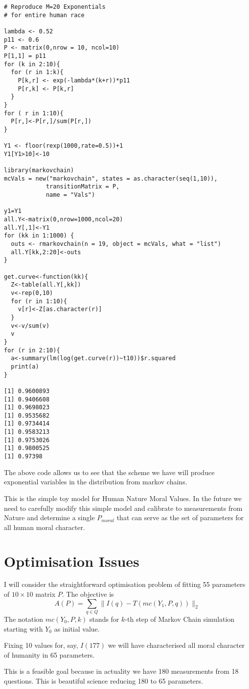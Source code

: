 \documentclass{amsart}
\begin{document}
\begin{verbatim}
# Reproduce M=20 Exponentials
# for entire human race

lambda <- 0.52
p11 <- 0.6
P <- matrix(0,nrow = 10, ncol=10)
P[1,1] = p11
for (k in 2:10){
  for (r in 1:k){
    P[k,r] <- exp(-lambda*(k+r))*p11
    P[r,k] <- P[k,r]
  }
}
for ( r in 1:10){
  P[r,]<-P[r,]/sum(P[r,])
}

Y1 <- floor(rexp(1000,rate=0.5))+1
Y1[Y1>10]<-10

library(markovchain)
mcVals = new("markovchain", states = as.character(seq(1,10)),
            transitionMatrix = P,          
            name = "Vals")

y1=Y1
all.Y<-matrix(0,nrow=1000,ncol=20)
all.Y[,1]<-Y1
for (kk in 1:1000) {
  outs <- rmarkovchain(n = 19, object = mcVals, what = "list")
  all.Y[kk,2:20]<-outs  
}

get.curve<-function(kk){
  Z<-table(all.Y[,kk])
  v<-rep(0,10)
  for (r in 1:10){
    v[r]<-Z[as.character(r)]
  }
  v<-v/sum(v)
  v
}
for (r in 2:10){
  a<-summary(lm(log(get.curve(r))~t10))$r.squared
  print(a)
}

[1] 0.9600893
[1] 0.9406608
[1] 0.9698023
[1] 0.9535682
[1] 0.9734414
[1] 0.9583213
[1] 0.9753026
[1] 0.9800525
[1] 0.97398
\end{verbatim}

The above code allows us to see that the scheme we have will produce exponential variables in the distribution from markov chains.

This is the simple toy model for Human Nature Moral Values.  In the future we need to carefully modify this simple model and calibrate to measurements from Nature and determine a single $P_{moral}$ that can serve as the set of parameters for all human moral character.

\section{Optimisation Issues}

I will consider the straightforward optimisation problem of fitting 55 parameters of $10 \times 10$ matrix $P$.  The objective is 
\[
A(P) = \sum_{q \in Q} \| I(q) - T(mc(Y_1, P, q)) \|_2
\]
The notation $mc(Y_0,P, k)$ stands for $k$-th step of Markov Chain simulation starting with $Y_0$ as initial value.

Fixing 10 values for, say, $I(177)$ we will have characterised all moral character of humanity in 65 parameters.

This is a feasible goal because in actuality we have 180 measurements from 18 questions.  This is beautiful science reducing 180 to 65 parameters.  
\end{document}
